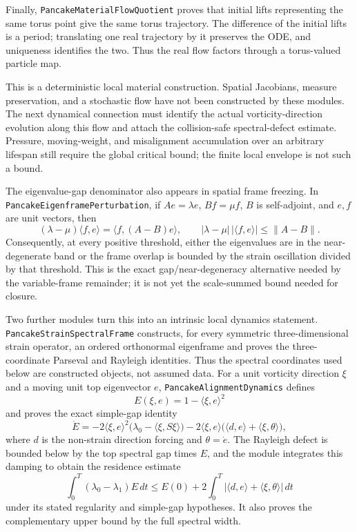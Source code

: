 \documentclass[11pt]{article}
\theoremstyle{definition}
\begin{document}
Finally, \texttt{PancakeMaterialFlowQuotient} proves that initial lifts
representing the same torus point give the same torus trajectory.
The difference of the initial lifts is a period; translating one real
trajectory by it preserves the ODE, and uniqueness identifies the two.
Thus the real flow factors through a torus-valued particle map.

This is a deterministic local material construction. Spatial Jacobians,
measure preservation, and a stochastic flow have not been constructed by
these modules. The next dynamical connection must identify the actual
vorticity-direction evolution along this flow and attach the collision-safe
spectral-defect estimate. Pressure, moving-weight, and misalignment
accumulation over an arbitrary lifespan still require the global critical
bound; the finite local envelope is not such a bound.



The eigenvalue-gap denominator also appears in spatial frame freezing. In
\texttt{PancakeEigenframePerturbation}, if $Ae=\lambda e$, $Bf=\mu f$, $B$
is self-adjoint, and $e,f$ are unit vectors, then
\[
  (\lambda-\mu)\langle f,e\rangle
    =\langle f,(A-B)e\rangle,
  \qquad
  |\lambda-\mu|\,|\langle f,e\rangle|\leq\|A-B\|.
\]
Consequently, at every positive threshold, either the eigenvalues are in the
near-degenerate band or the frame overlap is bounded by the strain oscillation
divided by that threshold.  This is the exact gap/near-degeneracy alternative
needed by the variable-frame remainder; it is not yet the scale-summed bound
needed for closure.

Two further modules turn this into an intrinsic local dynamics statement.
\texttt{PancakeStrainSpectralFrame} constructs, for every symmetric
three-dimensional strain operator, an ordered orthonormal eigenframe and
proves the three-coordinate Parseval and Rayleigh identities.  Thus the
spectral coordinates used below are constructed objects, not assumed data.
For a unit vorticity direction $\xi$ and a moving unit top eigenvector $e$,
\texttt{PancakeAlignmentDynamics} defines
\[
  E(\xi,e)=1-\langle\xi,e\rangle^2
\]
and proves the exact simple-gap identity
\[
 \dot E
 =-2\langle\xi,e\rangle^2
     \bigl(\lambda_0-\langle\xi,S\xi\rangle\bigr)
   -2\langle\xi,e\rangle
     \bigl(\langle d,e\rangle+\langle\xi,\theta\rangle\bigr),
\]
where $d$ is the non-strain direction forcing and $\theta=\dot e$.  The
Rayleigh defect is bounded below by the top spectral gap times $E$, and the
module integrates this damping to obtain the residence estimate
\[
 \int_0^T (\lambda_0-\lambda_1)E\,dt
 \le E(0)+2\int_0^T
   |\langle d,e\rangle+\langle\xi,\theta\rangle|\,dt
\]
under its stated regularity and simple-gap hypotheses.  It also proves the
complementary upper bound by the full spectral width.
\end{document}

